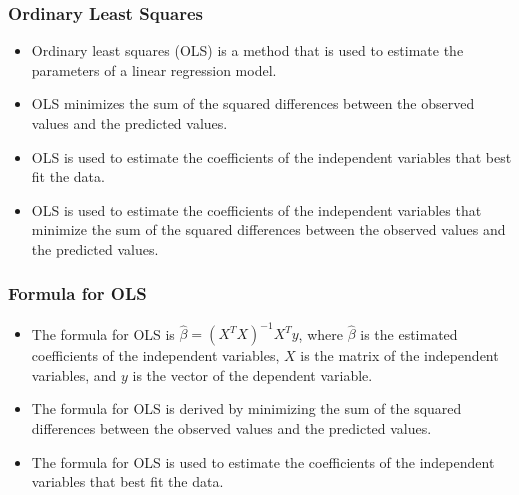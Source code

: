 \documentclass[serif, 9pt, aspectratio=32]{beamer}
\begin{document}
\begin{frame}
    \frametitle{Ordinary Least Squares}
    \begin{itemize}
        \setlength{\itemsep}{2em}
        \item Ordinary least squares (OLS) is a method that is used to estimate the parameters of a linear regression model.
        \item OLS minimizes the sum of the squared differences between the observed values and the predicted values.
        \item OLS is used to estimate the coefficients of the independent variables that best fit the data.
        \item OLS is used to estimate the coefficients of the independent variables that minimize the sum of the squared differences between the observed values and the predicted values.
    \end{itemize}
\end{frame}

\begin{frame}
    \frametitle{Formula for OLS}
    \begin{itemize}
        \setlength{\itemsep}{2em}
        \item The formula for OLS is $\hat{\beta} = (X^T X)^{-1} X^T y$, where $\hat{\beta}$ is the estimated coefficients of the independent variables, $X$ is the matrix of the independent variables, and $y$ is the vector of the dependent variable.
        \item The formula for OLS is derived by minimizing the sum of the squared differences between the observed values and the predicted values.
        \item The formula for OLS is used to estimate the coefficients of the independent variables that best fit the data.
    \end{itemize}
\end{frame}

\end{document}
